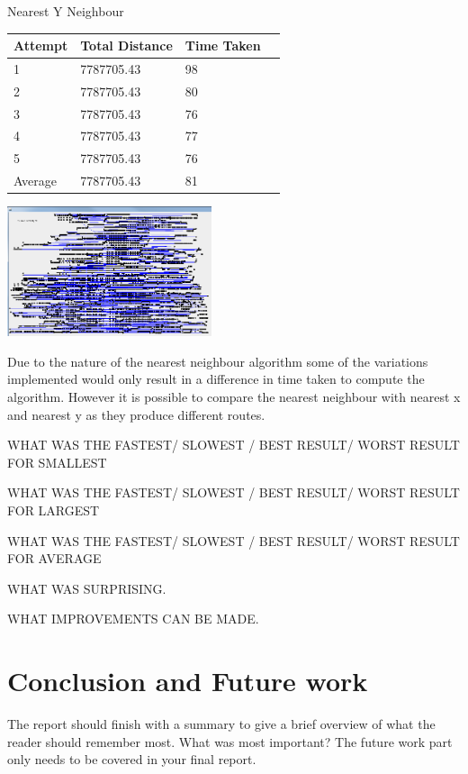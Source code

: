 \documentclass[conference,backref=page]{acmsiggraph}
\begin{document}
\begin{center}	
	
	Nearest Y Neighbour
	
	\begin{tabular}{| l | l | l | l |}
		\hline
		Attempt & Total Distance & Time Taken\\ \hline
		1 & 7787705.43 & 98 \\ \hline
		2 & 7787705.43 & 80  \\ \hline
		3 & 7787705.43 & 76 \\ \hline
		4 & 7787705.43 & 77 \\ \hline
		5 & 7787705.43 & 76 \\ \hline
		Average & 7787705.43 & 81 \\ \hline
	\end{tabular}
	
	 \includegraphics[height=1.5in]{images/rl5915ny}
\end{center}






Due to the nature of the nearest neighbour algorithm some of the variations implemented would only result in a difference in time taken to compute the algorithm. However it is possible to compare the nearest neighbour with nearest x and nearest y as they produce different routes. 

 WHAT WAS THE FASTEST/ SLOWEST / BEST RESULT/ WORST RESULT FOR SMALLEST 
 
 
 WHAT WAS THE FASTEST/ SLOWEST / BEST RESULT/ WORST RESULT FOR LARGEST
 
 
 WHAT WAS THE FASTEST/ SLOWEST / BEST RESULT/ WORST RESULT FOR AVERAGE
 
 WHAT WAS SURPRISING.
 
 WHAT IMPROVEMENTS CAN BE MADE.
  

\section{Conclusion and Future work}
The report should finish with a summary to give a brief overview of what the reader should remember most.  What was most important? The future work part only needs to be covered in your final report.






\end{document}
